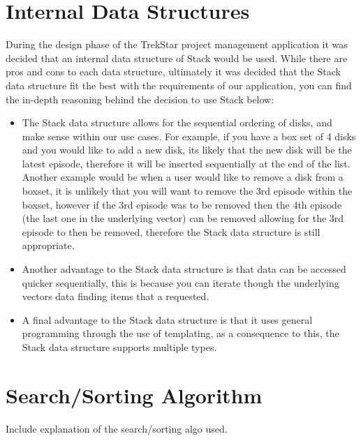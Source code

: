 \documentclass[
  english,
  a4paper,
,tablecaptionabove
]{scrartcl}
\providecommand{\tightlist}{%
  \setlength{\itemsep}{0pt}\setlength{\parskip}{0pt}}
\begin{document}
\newpage

\hypertarget{internal-data-structures}{%
\section{Internal Data Structures}\label{internal-data-structures}}

During the design phase of the TrekStar project management application
it was decided that an internal data structure of Stack would be used.
While there are pros and cons to each data structure, ultimately it was
decided that the Stack data structure fit the best with the requirements
of our application, you can find the in-depth reasoning behind the
decision to use Stack below:

\begin{itemize}
\tightlist
\item
  The Stack data structure allows for the sequential ordering of disks,
  and make sense within our use cases. For example, if you have a box
  set of 4 disks and you would like to add a new disk, its likely that
  the new disk will be the latest episode, therefore it will be inserted
  sequentially at the end of the list. Another example would be when a
  user would like to remove a disk from a boxset, it is unlikely that
  you will want to remove the 3rd episode within the boxset, however if
  the 3rd episode was to be removed then the 4th episode (the last one
  in the underlying vector) can be removed allowing for the 3rd episode
  to then be removed, therefore the Stack data structure is still
  appropriate.
\item
  Another advantage to the Stack data structure is that data can be
  accessed quicker sequentially, this is because you can iterate though
  the underlying vectors data finding items that a requested.
\item
  A final advantage to the Stack data structure is that it uses general
  programming through the use of templating, as a consequence to this,
  the Stack data structure supports multiple types.
\end{itemize}

\newpage

\hypertarget{searchsorting-algorithm}{%
\section{Search/Sorting Algorithm}\label{searchsorting-algorithm}}

Include explanation of the search/sorting algo used.
\end{document}
